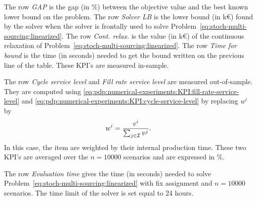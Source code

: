 The row \emph{GAP} is the gap (in \%) between the objective value and the best known lower bound on the problem.
The row \emph{Solver LB} is the lower bound (in k\euro{}) found by the solver when the solver is frontally used to solve Problem~\eqref{eq:stoch-multi-sourcing:linearized}.
The row \emph{Cont. relax.} is the value (in k\euro{}) of the continuous relaxation of Problem~\eqref{eq:stoch-multi-sourcing:linearized}.
The row \emph{Time for bound} is the time (in seconds) needed to get the bound written on the previous line of the table.
These KPI's are measured in-sample.


The row \emph{Cycle service level} and \emph{Fill rate service level} are measured out-of-sample.
They are computed using \cref{eq:pdp:numerical-experiments:KPI:fill-rate-service-level} and \cref{eq:pdp:numerical-experiments:KPI:cycle-service-level} by replacing $w^i$ by
\begin{equation}\label{eq:multi-sourcing:numerical-experiments:KPI:weight}
  w^i=\frac{v^i}{\sum_{j\in\mathcal{I}}v^j}.
\end{equation}
In this case, the item are weighted by their internal production time.
These two KPI's are averaged over the $n=10000$ scenarios and are expressed in \%.


The row \emph{Evaluation time} gives the time (in seconds) needed to solve Problem~\eqref{eq:stoch-multi-sourcing:linearized} with fix assignment and $n=10000$ scenarios.
The time limit of the solver is set equal to 24 hours.


